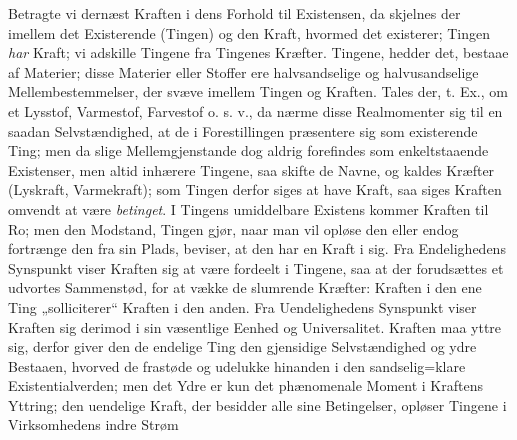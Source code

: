 \documentclass[12pt]{book}
\newcommand{\opage}[1]{\marginnote{\footnotesize\textit{[#1]}}}
\begin{document}
Betragte vi dernæst Kraften i dens Forhold til Existensen, da skjelnes der imellem det
Existerende (Tingen) og den Kraft, hvormed det existerer; Tingen \emph{har} Kraft; vi adskille
Tingene fra Tingenes Kræfter. Tingene, hedder det, bestaae af Materier; disse Materier eller
Stoffer ere halvsandselige og halvusandselige Mellembestemmelser, der svæve imellem Tingen og
Kraften. Tales der, t. Ex., om et Lysstof, Varmestof, Farvestof o. s. v., da nærme disse
Realmomenter sig til en saadan Selvstændighed, at de i Forestillingen præsentere sig som
existerende Ting; men da slige Mellemgjenstande dog aldrig forefindes som enkeltstaaende
Existenser, men altid inhærere Tingene, saa skifte de Navne, og kaldes Kræfter (Lyskraft,
Varmekraft); som Tingen derfor siges at have Kraft, saa siges Kraften omvendt at være
\emph{betinget}. I Tingens umiddelbare Existens kommer Kraften til Ro; men den Modstand, Tingen
gjør, naar man vil opløse den eller endog fortrænge den fra sin Plads, beviser, at den har en
Kraft i sig. Fra Endelighedens Synspunkt viser Kraften sig at være fordeelt i Tingene, saa at
der forudsættes et udvortes Sammenstød, for at vække de slumrende Kræfter: Kraften i den ene
Ting „solliciterer“ Kraften i den anden. Fra Uendelighedens Synspunkt viser Kraften sig derimod
i sin væsentlige Eenhed og Universalitet. Kraften maa yttre sig, derfor giver den de endelige
Ting den gjensidige Selvstændighed og ydre Bestaaen, hvorved de frastøde og udelukke hinanden i
den sandselig=klare Existentialverden; men det Ydre er kun det phænomenale Moment i Kraftens
Yttring; den uendelige Kraft, der besidder alle sine Betingelser, opløser Tingene i
Virksomhedens indre Strøm%
\opage{142}%
\end{document}
